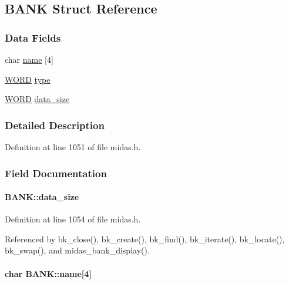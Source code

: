 \subsection{BANK Struct Reference}
\label{structBANK}
\subsubsection*{Data Fields}
\begin{DoxyCompactItemize}
\item 
char \hyperlink{structBANK_a39a277bc7edde0d3e783ef0d93f44c1e}{name} \mbox{[}4\mbox{]}
\item 
\hyperlink{vt2_8h_a2b0e863dadf920709ec53d9088ee7c91}{WORD} \hyperlink{structBANK_a91558478db8ed86d585715b8217ca72f}{type}
\item 
\hyperlink{vt2_8h_a2b0e863dadf920709ec53d9088ee7c91}{WORD} \hyperlink{structBANK_a95afeb25db8deb1ea4cffd6ba50a6dcf}{data\_\-size}
\end{DoxyCompactItemize}


\subsubsection{Detailed Description}


Definition at line 1051 of file midas.h.

\subsubsection{Field Documentation}
\paragraph[{data\_\-size}]{ {\bf BANK::data\_\-size}}\hfill\label{structBANK_a95afeb25db8deb1ea4cffd6ba50a6dcf}

\begin{DoxyItemize}
\item 
\end{DoxyItemize}

Definition at line 1054 of file midas.h.

Referenced by bk\_\-close(), bk\_\-create(), bk\_\-find(), bk\_\-iterate(), bk\_\-locate(), bk\_\-swap(), and midas\_\-bank\_\-display().
\paragraph[{name}]{\setlength{\rightskip}{0pt plus 5cm}char {\bf BANK::name}\mbox{[}4\mbox{]}}\hfill\label{structBANK_a39a277bc7edde0d3e783ef0d93f44c1e}

